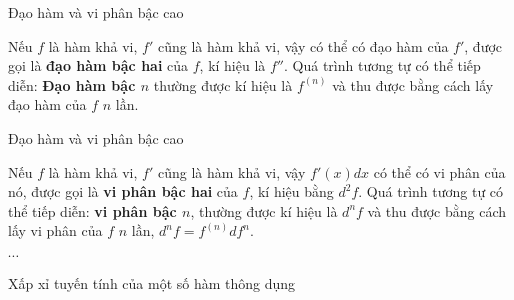 \begin{frame}{Đạo hàm và vi phân bậc cao}
    \begin{tcolorbox}[colback=blue!10, colframe=blue!50!black, title=Đạo hàm bậc cao]
    Nếu $f$ là hàm khả vi, $f'$ cũng là hàm khả vi, vậy có thể có đạo hàm của $f'$, được gọi là \textbf{đạo hàm bậc hai} của $f$, kí hiệu là $f''$. Quá trình tương tự có thể tiếp diễn: \textbf{Đạo hàm bậc $n$} thường được kí hiệu là $f^{(n)}$ và thu được bằng cách lấy đạo hàm của $f$ $n$ lần.
    \end{tcolorbox}
    \end{frame}
    \begin{frame}{Đạo hàm và vi phân bậc cao}
    \begin{tcolorbox}[colback=blue!10, colframe=blue!50!black, title=Vi phân bậc cao]
    Nếu $f$ là hàm khả vi, $f'$ cũng là hàm khả vi, vậy $f'(x)dx$ có thể có vi phân của nó, được gọi là \textbf{vi phân bậc hai} của $f$, kí hiệu bằng $d^2 f$. Quá trình tương tự có thể tiếp diễn: \textbf{vi phân bậc $n$}, thường được kí hiệu là $d^nf$ và thu được bằng cách lấy vi phân của $f$ $n$ lần, $d^nf=f^{(n)}df^n$.
    \end{tcolorbox}
     \begin{tcolorbox}[colback=blue!10, colframe=blue!50!black, title=Công thức Leibniz]
     $\cdots$
     \end{tcolorbox}
\end{frame}

\begin{frame}{Xấp xỉ tuyến tính của một số hàm thông dụng}
    
\end{frame}